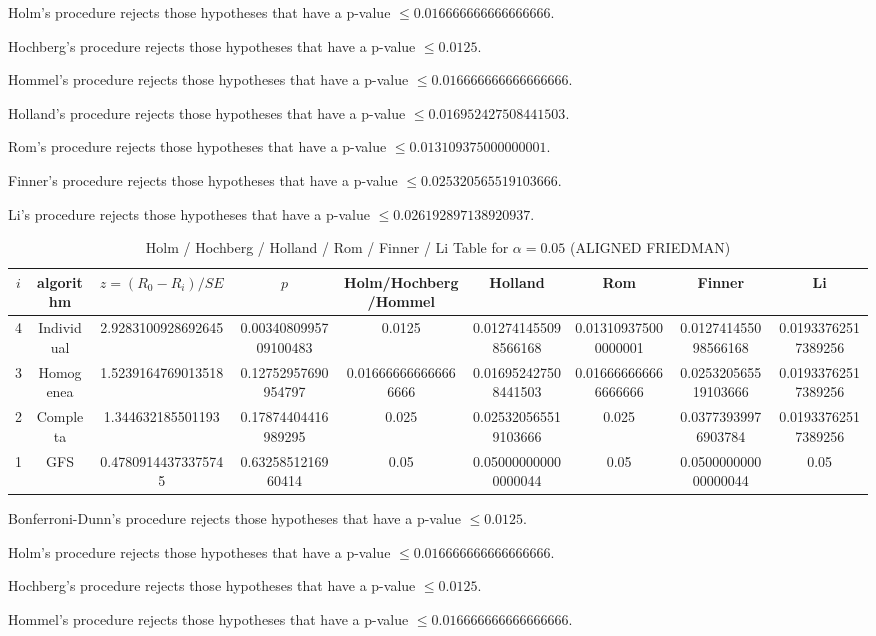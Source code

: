 \documentclass[a4paper,10pt]{article}
\begin{document}
\begin{landscape}
Holm's procedure rejects those hypotheses that have a p-value $\le0.016666666666666666$.


Hochberg's procedure rejects those hypotheses that have a p-value $\le0.0125$.


Hommel's procedure rejects those hypotheses that have a p-value $\le0.016666666666666666$.


Holland's procedure rejects those hypotheses that have a p-value $\le0.016952427508441503$.


Rom's procedure rejects those hypotheses that have a p-value $\le0.013109375000000001$.


Finner's procedure rejects those hypotheses that have a p-value $\le0.025320565519103666$.


Li's procedure rejects those hypotheses that have a p-value $\le0.026192897138920937$.



\newpage

\begin{table}[!htp]
\centering\scriptsize
\caption{Holm / Hochberg / Holland / Rom / Finner / Li Table for $\alpha=0.05$ (ALIGNED FRIEDMAN)}
\begin{tabular}{ccccccccc}
$i$&algorithm&$z=(R_0 - R_i)/SE$&$p$&Holm/Hochberg/Hommel&Holland&Rom&Finner&Li\\
\hline
4&Individual&2.9283100928692645&0.0034080995709100483&0.0125&0.012741455098566168&0.013109375000000001&0.012741455098566168&0.01933762517389256\\
3&Homogenea&1.5239164769013518&0.12752957690954797&0.016666666666666666&0.016952427508441503&0.016666666666666666&0.025320565519103666&0.01933762517389256\\
2&Completa&1.344632185501193&0.17874404416989295&0.025&0.025320565519103666&0.025&0.03773939976903784&0.01933762517389256\\
1&GFS&0.47809144373375745&0.6325851216960414&0.05&0.050000000000000044&0.05&0.050000000000000044&0.05\\
\hline
\end{tabular}
\end{table}
Bonferroni-Dunn's procedure rejects those hypotheses that have a p-value $\le0.0125$.


Holm's procedure rejects those hypotheses that have a p-value $\le0.016666666666666666$.


Hochberg's procedure rejects those hypotheses that have a p-value $\le0.0125$.


Hommel's procedure rejects those hypotheses that have a p-value $\le0.016666666666666666$.



\end{landscape}
\end{document}
